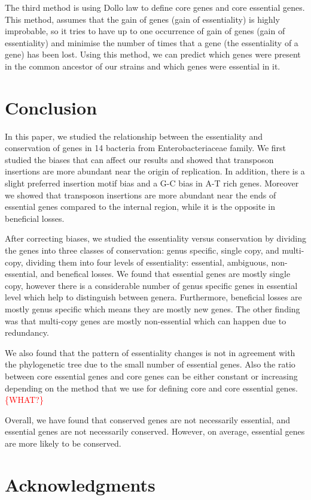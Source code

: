 \documentclass[12pt,letterpaper]{article}
\begin{document}
The third method is using Dollo law to define core genes and core essential genes. This method, assumes that the gain of genes (gain of essentiality) is highly improbable, so it tries to have up to one occurrence of gain of genes (gain of essentiality) and minimise the number of times that a gene (the essentiality of a gene) has been lost. Using this method, we can predict which genes were present in the common ancestor of our strains and which genes were essential in it.

\section{Conclusion}
In this paper, we studied the relationship between the essentiality and conservation of genes in 14 bacteria from Enterobacteriaceae family. We first studied the biases that can affect our results and showed that transposon insertions are more abundant near the origin of replication. In addition, there is a slight preferred insertion motif bias and a G-C bias in A-T rich genes. Moreover we showed that transposon insertions are more abundant near the ends of essential genes compared to the internal region, while it is the opposite in beneficial losses.

After correcting biases, we studied the essentiality versus conservation by dividing the genes into three classes of conservation: genus specific, single copy, and multi-copy, dividing them into four levels of essentiality: essential, ambiguous, non-essential, and benefical losses. We found that essential genes are mostly single copy, however there is a considerable number of genus specific genes in essential level which help to distinguish between genera. Furthermore, beneficial losses are mostly genus specific which means they are mostly new genes. The other finding was that multi-copy genes are mostly non-essential which can happen due to redundancy.

We also found that the pattern of essentiality changes is not in agreement with the phylogenetic tree due to the small number of essential genes. Also the ratio between core essential genes and core genes can be either constant or increasing depending on the method that we use for defining core and core essential genes. \textcolor{red}{\{WHAT?\}}

Overall, we have found that conserved genes are not necessarily essential, and essential genes are not necessarily conserved. However, on average, essential genes are more likely to be conserved.

\section*{Acknowledgments}
%
%




\end{document}
